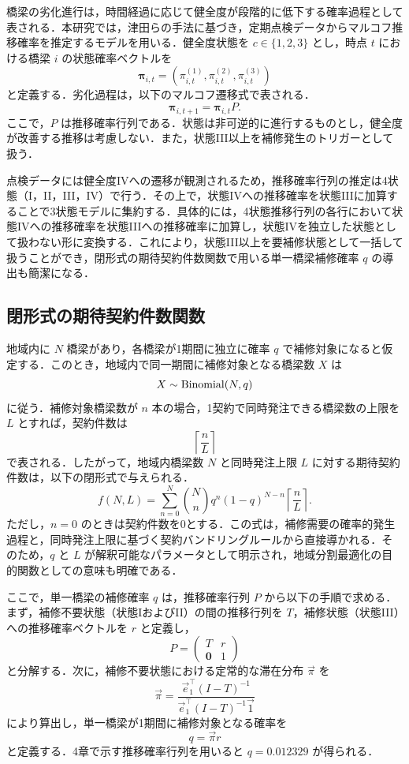 \documentclass[Journal,letterpaper,InsideFigs,NoLineNumbers]{ascelike-new}
\begin{document}
橋梁の劣化進行は，時間経過に応じて健全度が段階的に低下する確率過程として表される．本研究では，津田ら\cite{tsuda2005}の手法に基づき，定期点検データからマルコフ推移確率を推定するモデルを用いる．健全度状態を \(c\in\{1,2,3\}\) とし，時点 \(t\) における橋梁 \(i\) の状態確率ベクトルを
\[
{\mathbf \pi}_{i,t}
=
\left(
\pi_{i,t}^{(1)},\pi_{i,t}^{(2)},\pi_{i,t}^{(3)}
\right)
\]
と定義する．劣化過程は，以下のマルコフ遷移式で表される．
\[
{\mathbf \pi}_{i,t+1}
=
{\mathbf \pi}_{i,t}P .
\]
ここで，\(P\) は推移確率行列である．状態は非可逆的に進行するものとし，健全度が改善する推移は考慮しない．また，状態III以上を補修発生のトリガーとして扱う．

点検データには健全度IVへの遷移が観測されるため，推移確率行列の推定は4状態（I，II，III，IV）で行う．その上で，状態IVへの推移確率を状態IIIに加算することで3状態モデルに集約する．具体的には，4状態推移行列の各行において状態IVへの推移確率を状態IIIへの推移確率に加算し，状態IVを独立した状態として扱わない形に変換する．これにより，状態III以上を要補修状態として一括して扱うことができ，閉形式の期待契約件数関数で用いる単一橋梁補修確率 \(q\) の導出も簡潔になる．

\subsection{閉形式の期待契約件数関数}

地域内に \(N\) 橋梁があり，各橋梁が1期間に独立に確率 \(q\) で補修対象になると仮定する．このとき，地域内で同一期間に補修対象となる橋梁数 \(X\) は
\[
X \sim {\rm Binomial}(N,q)
\]
に従う．補修対象橋梁数が \(n\) 本の場合，1契約で同時発注できる橋梁数の上限を \(L\) とすれば，契約件数は
\[
\left\lceil \frac{n}{L} \right\rceil
\]
で表される．したがって，地域内橋梁数 \(N\) と同時発注上限 \(L\) に対する期待契約件数は，以下の閉形式で与えられる．
\[
f(N,L)
=
\sum_{n=0}^{N}
{N\choose n}q^n(1-q)^{N-n}
\left\lceil \frac{n}{L} \right\rceil .
\]
ただし，\(n=0\) のときは契約件数を0とする．この式は，補修需要の確率的発生過程と，同時発注上限に基づく契約バンドリングルールから直接導かれる．そのため，\(q\) と \(L\) が解釈可能なパラメータとして明示され，地域分割最適化の目的関数としての意味も明確である．

ここで，単一橋梁の補修確率 \(q\) は，推移確率行列 \(P\) から以下の手順で求める．まず，補修不要状態（状態IおよびII）の間の推移行列を \(T\)，補修状態（状態III）への推移確率ベクトルを \(r\) と定義し，
\[
P =
\left(
\begin{array}{cc}
T & r \\
\mathbf{0} & 1
\end{array}
\right)
\]
と分解する．次に，補修不要状態における定常的な滞在分布 \(\vec{\pi}\) を
\[
\vec{\pi}
=
\frac{\vec{e}_1^\top (I-T)^{-1}}
{\vec{e}_1^\top (I-T)^{-1} \vec{1}}
\]
により算出し，単一橋梁が1期間に補修対象となる確率を
\[
q = \vec{\pi} r
\]
と定義する．4章で示す推移確率行列を用いると \(q=0.012329\) が得られる．
\end{document}
